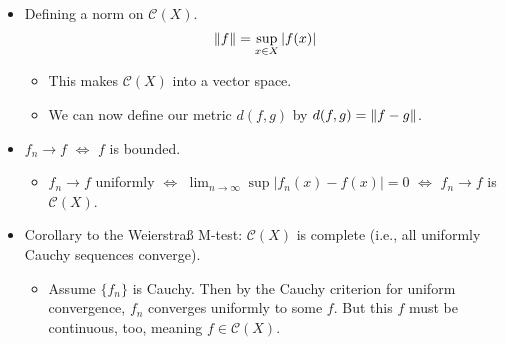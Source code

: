 \documentclass[../notes.tex]{subfiles}
\begin{document}
\begin{itemize}
\begin{itemize}
    \end{itemize}
    \item Defining a norm on $\mathcal{C}(X)$.
    \begin{equation*}
        \norm{f} = \sup_{x\in X}|f(x)|
    \end{equation*}
    \begin{itemize}
        \item This makes $\mathcal{C}(X)$ into a vector space.
        \item We can now define our metric $d(f,g)$ by $d(f,g)=\norm{f-g}$.
    \end{itemize}
    \item $f_n\to f$ $\Longleftrightarrow$ $f$ is bounded.
    \begin{itemize}
        \item $f_n\to f$ uniformly $\Longleftrightarrow$ $\lim_{n\to\infty}\sup|f_n(x)-f(x)|=0$ $\Longleftrightarrow$ $f_n\to f$ is $\mathcal{C}(X)$.
    \end{itemize}
    \item Corollary to the Weierstra{\ss} M-test: $\mathcal{C}(X)$ is complete (i.e., all uniformly Cauchy sequences converge).
    \begin{itemize}
        \item Assume $\{f_n\}$ is Cauchy. Then by the Cauchy criterion for uniform convergence, $f_n$ converges uniformly to some $f$. But this $f$ must be continuous, too, meaning $f\in\mathcal{C}(X)$.
    \end{itemize}
\end{itemize}
\end{document}
